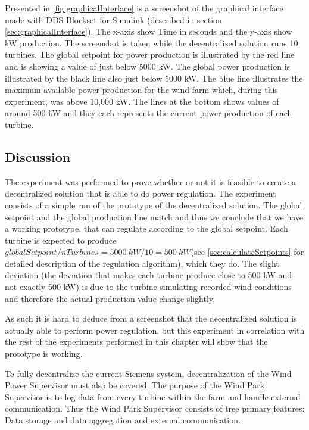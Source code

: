 Presented in \cref{fig:graphicalInterface} is a screenshot of the graphical interface made with DDS Blockset for Simulink (described in section \cref{sec:graphicalInterface}). The x-axis show Time in seconds and the y-axis show kW production. The screenshot is taken while the decentralized solution runs 10 turbines.
The global setpoint for power production is illustrated by the red line and is showing a value of just below 5000 kW. The global power production is illustrated by the black line also just below 5000 kW.
The blue line illustrates the maximum available power production for the wind farm which, during this experiment, was above 10,000 kW. The lines at the bottom shows values of around 500 kW and they each represents the current power production of each turbine.

\subsection{Discussion}\label{feas:discussion}
The experiment was performed to prove whether or not it is feasible to create a decentralized solution that is able to do power regulation. The experiment consists of a simple run of the prototype of the decentralized solution. The global setpoint and the global production line match and thus we conclude that we have a working prototype, that can regulate according to the global setpoint. Each turbine is expected to produce $globalSetpoint/nTurbines=5000~kW/10=500~kW$(see \cref{sec:calculateSetpoints} for detailed description of the regulation algorithm), which they do. The slight deviation (the deviation that makes each turbine produce close to 500 kW and not exactly 500 kW) is due to the turbine simulating recorded wind conditions and therefore the actual production value change slightly.

As such it is hard to deduce from a screenshot that the decentralized solution is actually able to perform power regulation, but this experiment in correlation with the rest of the experiments performed in this chapter will show that the prototype is working.

To fully decentralize the current Siemens system, decentralization of the Wind Power Supervisor must also be covered. The purpose of the Wind Park Supervisor is to log data from every turbine within the farm and handle external communication. Thus the Wind Park Supervisor consists of tree primary features: Data storage and data aggregation and external communication. 

